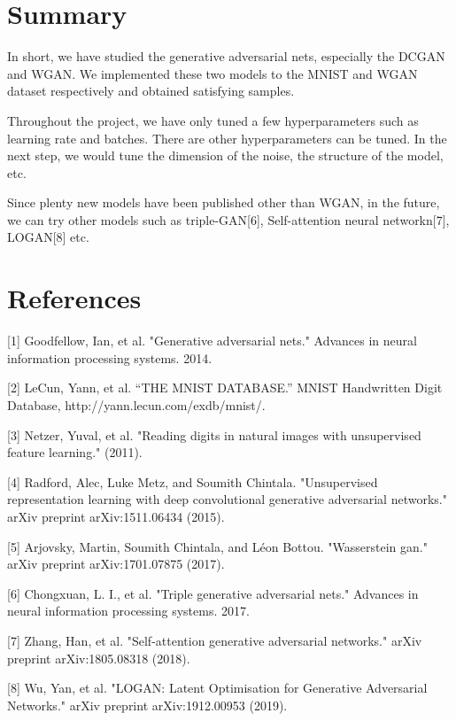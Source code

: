\documentclass{article}
\begin{document}
\section{Summary}

In short, we have studied the generative adversarial nets, especially the DCGAN and WGAN. We implemented these two models to the MNIST and WGAN dataset respectively and obtained satisfying samples.

Throughout the project, we have only tuned a few hyperparameters such as learning rate and batches. There are other hyperparameters can be tuned. In the next step, we would tune the dimension of the noise, the structure of the model, etc.

Since plenty new models have been published other than WGAN, in the future, we can try other models such as triple-GAN[6], Self-attention neural networkn[7], LOGAN[8] etc.

\section*{References}

[1] Goodfellow, Ian, et al. "Generative adversarial nets." Advances in neural information processing systems. 2014.

[2] LeCun, Yann, et al. “THE MNIST DATABASE.” MNIST Handwritten Digit Database, http://yann.lecun.com/exdb/mnist/.

[3] Netzer, Yuval, et al. "Reading digits in natural images with unsupervised feature learning." (2011).

[4] Radford, Alec, Luke Metz, and Soumith Chintala. "Unsupervised representation learning with deep convolutional generative adversarial networks." arXiv preprint arXiv:1511.06434 (2015).

[5] Arjovsky, Martin, Soumith Chintala, and Léon Bottou. "Wasserstein gan." arXiv preprint arXiv:1701.07875 (2017).

[6] Chongxuan, L. I., et al. "Triple generative adversarial nets." Advances in neural information processing systems. 2017.

[7] Zhang, Han, et al. "Self-attention generative adversarial networks." arXiv preprint arXiv:1805.08318 (2018).

[8] Wu, Yan, et al. "LOGAN: Latent Optimisation for Generative Adversarial Networks." arXiv preprint arXiv:1912.00953 (2019).
\end{document}
